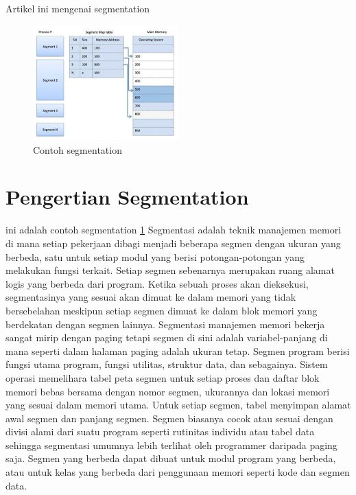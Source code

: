﻿%


Artikel ini mengenai segmentation

  \begin{figure}[ht]
\centerline{\includegraphics[width=0.5\textwidth]{figures/segmentation.jpg}}
  \caption{Contoh segmentation}
  \label{segmentation}
  \end{figure}

\section{Pengertian Segmentation}
ini adalah contoh segmentation \ref{segmentation}
Segmentasi adalah teknik manajemen memori di mana setiap pekerjaan dibagi menjadi beberapa segmen dengan ukuran yang berbeda, satu untuk setiap modul yang berisi potongan-potongan yang melakukan fungsi terkait. Setiap segmen sebenarnya merupakan ruang alamat logis yang berbeda dari program. Ketika sebuah proses akan dieksekusi, segmentasinya yang sesuai akan dimuat ke dalam memori yang tidak bersebelahan meskipun setiap segmen dimuat ke dalam blok memori yang berdekatan dengan segmen lainnya.
Segmentasi manajemen memori bekerja sangat mirip dengan paging tetapi segmen di sini adalah variabel-panjang di mana seperti dalam halaman paging adalah ukuran tetap.
Segmen program berisi fungsi utama program, fungsi utilitas, struktur data, dan sebagainya. Sistem operasi memelihara tabel peta segmen untuk setiap proses dan daftar blok memori bebas bersama dengan nomor segmen, ukurannya dan lokasi memori yang sesuai dalam memori utama. Untuk setiap segmen, tabel menyimpan alamat awal segmen dan panjang segmen.
Segmen biasanya cocok atau sesuai dengan divisi alami dari suatu program seperti rutinitas individu atau tabel data sehingga segmentasi umumnya lebih terlihat oleh programmer daripada paging saja.  Segmen yang berbeda dapat dibuat untuk modul program yang berbeda, atau untuk kelas yang berbeda dari penggunaan memori seperti kode dan segmen data\cite{cepulis1992computer}.

